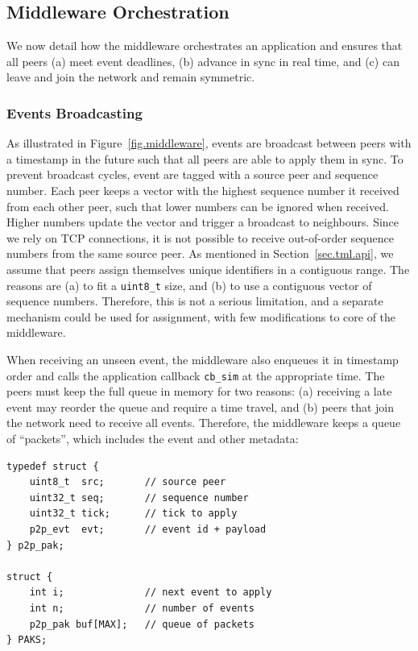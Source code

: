 \documentclass[10pt,journal,compsoc]{IEEEtran}
\newcommand{\code}[1]  {\texttt{\footnotesize{#1}}}
\begin{document}
\subsection{Middleware Orchestration}
\label{sec.tml.middleware}

We now detail how the middleware orchestrates an application and ensures that
all peers
    (a) meet event deadlines,
    (b) advance in sync in real time, and
    (c) can leave and join the network and remain symmetric.

\subsubsection{Events Broadcasting}
\label{sec.tml.middleware.events}

As illustrated in Figure~\ref{fig.middleware}, events are broadcast between
peers with a timestamp in the future such that all peers are able to apply them
in sync.
%
To prevent broadcast cycles, event are tagged with a source peer and sequence
number.
Each peer keeps a vector with the highest sequence number it received from each
other peer, such that lower numbers can be ignored when received.
Higher numbers update the vector and trigger a broadcast to neighbours.
Since we rely on TCP connections, it is not possible to receive out-of-order
sequence numbers from the same source peer.
%
As mentioned in Section~\ref{sec.tml.api}, we assume that peers assign
themselves unique identifiers in a contiguous range.
The reasons are
    (a) to fit a \code{uint8\_t} size, and
    (b) to use a contiguous vector of sequence numbers.
Therefore, this is not a serious limitation, and a separate mechanism could be
used for assignment, with few modifications to core of the middleware.

When receiving an unseen event, the middleware also enqueues it in timestamp
order and calls the application callback \code{cb\_sim} at the appropriate
time.
The peers must keep the full queue in memory for two reasons:
    (a) receiving a late event may reorder the queue and require a time
        travel, and
    (b) peers that join the network need to receive all events.
%
Therefore, the middleware keeps a queue of ``packets'', which includes the
event and other metadata:

{\footnotesize
\begin{verbatim}
typedef struct {
    uint8_t  src;       // source peer
    uint32_t seq;       // sequence number
    uint32_t tick;      // tick to apply
    p2p_evt  evt;       // event id + payload
} p2p_pak;

struct {
    int i;              // next event to apply
    int n;              // number of events
    p2p_pak buf[MAX];   // queue of packets
} PAKS;
\end{verbatim}
}
\end{document}
